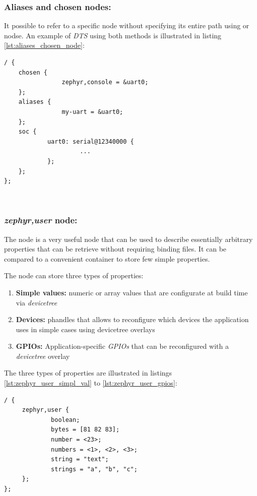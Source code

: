 \documentclass[report.tex]{subfiles}
\begin{document}
\subsubsection{Aliases and chosen nodes:}
It possible to refer to a specific node without specifying its entire path using  or  nodse. An example of \textit{DTS} using both methods is illustrated in listing \ref{lst:aliases_chosen_node}:

\begin{lstlisting}[style=C,label={lst:aliases_chosen_node},caption={Example \textit{DTS} File using \textit{chosen} and \textit{aliases} nodes - Source:\cite{dt_zephyr_user}}]
/ {
	chosen {
				zephyr,console = &uart0;
	};
	aliases {
				my-uart = &uart0;
	};
	soc {
			uart0: serial@12340000 {
                     ...
			};
	};
};
\end{lstlisting}
\;\\[-60pt]
\subsubsection{\textit{zephyr,user} node:}

The  node is a very useful node that can be used to describe essentially arbitrary properties that can be retrieve without requiring binding files. It can be compared to a convenient container to store few simple properties.

The  node can store three types of properties:
\begin{enumerate}
\item \textbf{Simple values:} numeric or array values that are configurate at build time via \textit{devicetree}
\item \textbf{Devices:} phandles that allows to reconfigure which devices the application uses in simple cases using devicetree overlays
\item \textbf{GPIOs:} Application-specific \textit{GPIOs} that can be reconfigured with a \textit{devicetree} overlay
\end{enumerate}

The three types of properties are illustrated in listings \ref{lst:zephyr_user_simpl_val} to \ref{lst:zephyr_user_gpios}:

\begin{lstlisting}[style=C,label={lst:zephyr_user_simpl_val},caption={Example \textit{zephyr,user} Node - Simple Value Properties - Source:\cite{dt_zephyr_user}}]
/ {
     zephyr,user {
             boolean;
             bytes = [81 82 83];
             number = <23>;
             numbers = <1>, <2>, <3>;
             string = "text";
             strings = "a", "b", "c";
     };
};
\end{lstlisting}
\end{document}
